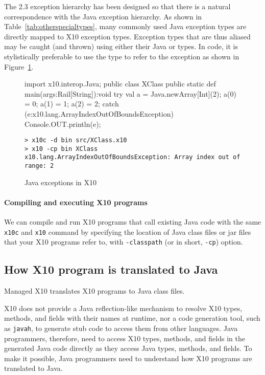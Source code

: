 The \Xten{} 2.3 exception hierarchy has been designed so that there is a
natural correspondence with the Java exception hierarchy. As shown in
Table~\ref{tab:otherspecialtypes}, many commonly used Java
exception types are directly mapped to X10 exception types. 
Exception types that are thus aliased may be caught (and thrown) using
either their Java or \Xten types.  In \Xten code, it is stylistically
preferable to use the \Xten type to refer to the exception as shown in 
Figure~\ref{fig:javaexceptions}.

\begin{figure}
\begin{xten}
import x10.interop.Java;
public class XClass {   
  public static def main(args:Rail[String]):void {
    try {
      val a = Java.newArray[Int](2);
      a(0) = 0;
      a(1) = 1;
      a(2) = 2;
    } catch (e:x10.lang.ArrayIndexOutOfBoundsException) {
      Console.OUT.println(e);
    }
  }
}
\end{xten}
\begin{verbatim}
> x10c -d bin src/XClass.x10
> x10 -cp bin XClass
x10.lang.ArrayIndexOutOfBoundsException: Array index out of range: 2
\end{verbatim}
\caption{Java exceptions in X10}
\label{fig:javaexceptions}
\end{figure}

\paragraph{Compiling and executing X10 programs}

We can compile and run X10 programs that call existing Java code with
the same \verb|x10c| and \verb|x10| command by specifying the location
of Java class files or jar files that your X10 programs refer to, with
\verb|-classpath| (or in short, \verb|-cp|) option.

\subsection{How X10 program is translated to Java}

Managed X10 translates X10 programs to Java class files. 

X10 does not provide a Java reflection-like mechanism to resolve X10
types, methods, and fields with their names at runtime, nor a code
generation tool, such as \verb|javah|, to generate stub code to access
them from other languages.  Java programmers, therefore, need to
access X10 types, methods, and fields in the generated Java code
directly as they access Java types, methods, and fields.  To make it
possible, Java programmers need to understand how X10 programs are
translated to Java.


